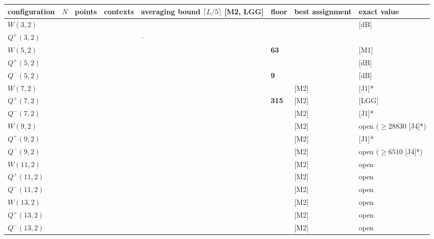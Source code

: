 \documentclass[11pt,a4paper]{article}
\begin{document}
{\def\LTcaptype{none} %
{\footnotesize
\begin{longtable}[]{@{}>{\raggedright\arraybackslash}p{}>{\raggedright\arraybackslash}p{}>{\raggedright\arraybackslash}p{}>{\raggedright\arraybackslash}p{}>{\raggedright\arraybackslash}p{}>{\raggedright\arraybackslash}p{}>{\raggedright\arraybackslash}p{}>{\raggedright\arraybackslash}p{}@{}}
\toprule\noalign{}
configuration & \(N\) & points & contexts & averaging bound \(\lceil L/5\rceil\) {[}M2, LGG{]} & floor & best assignment & exact value \\
\midrule\noalign{}
\endhead
\bottomrule\noalign{}
\endlastfoot
\(W(3,2)\) & 2 & 15 & 15 & 3 & 2 & 3 & 3 {[}dB{]} \\
\(Q^+(3,2)\) & 2 & 9 & 6 & -- & 1 & 1 & 1 \\
\(W(5,2)\) & 3 & 63 & 315 & 63 & \textbf{63} & 63 & 63 {[}M1{]} \\
\(Q^+(5,2)\) & 3 & 35 & 105 & 21 & 14 & 21 & 21 {[}dB{]} \\
\(Q^-(5,2)\) & 3 & 27 & 45 & 9 & \textbf{9} & 9 & 9 {[}dB{]} \\
\(W(7,2)\) & 4 & 255 & 5355 & 1071 & 1451 & 1575 {[}M2{]} & 1575 {[}J1{]}* \\
\(Q^+(7,2)\) & 4 & 135 & 1575 & 315 & \textbf{315} & 315 {[}M2{]} & 315 {[}LGG{]} \\
\(Q^-(7,2)\) & 4 & 119 & 1071 & 215 & 291 & 315 {[}M2{]} & 315 {[}J1{]}* \\
\(W(9,2)\) & 5 & 1023 & 86955 & 17391 & 28786 & 31479 {[}M2{]} & open (\(\ge 28830\) {[}J4{]}*) \\
\(Q^+(9,2)\) & 5 & 527 & 23715 & 4743 & 6426 & 6975 {[}M2{]} & 6975 {[}J1{]}* \\
\(Q^-(9,2)\) & 5 & 495 & 19635 & 3927 & 6501 & 7087 {[}M2{]} & open (\(\ge 6510\) {[}J4{]}*) \\
\(W(11,2)\) & 6 & 4095 & 1396395 & 279279 & 527621 & 553140 {[}M2{]} & open \\
\(Q^+(11,2)\) & 6 & 2079 & 365211 & 73043 & 120901 & 132391 {[}M2{]} & open \\
\(Q^-(11,2)\) & 6 & 2015 & 332475 & 66495 & 125624 & 131700 {[}M2{]} & open \\
\(W(13,2)\) & 7 & 16383 & 22362795 & 4472559 & 9227609 & 9406024 {[}M2{]} & open \\
\(Q^+(13,2)\) & 7 & 8255 & 5720715 & 1144143 & 2161542 & 2331191 {[}M2{]} & open \\
\(Q^-(13,2)\) & 7 & 8127 & 5458635 & 1091727 & 2252409 & 2294580 {[}M2{]} & open \\
\end{longtable}
}
}
\end{document}
